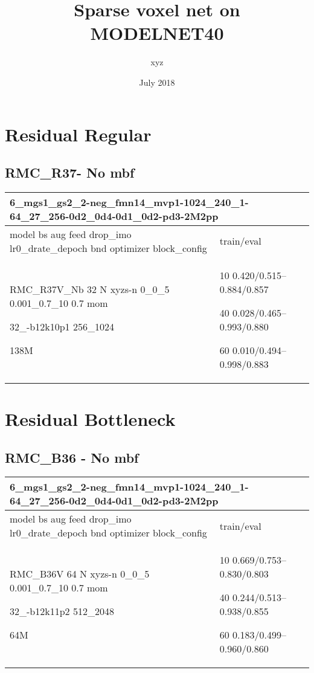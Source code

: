 \documentclass[,table,dvipsnames]{article}
\title{Sparse voxel net on MODELNET40}
\author{xyz}
\date{July 2018}
\begin{document}
\noindent
\begin{titlepage}
	\maketitle
\end{titlepage}	

\tableofcontents{}

\section{Residual Regular}
\subsection{RMC\_R37- No mbf}
\noindent\begin{tabular}{|p{10cm}|p{5cm}| }	
	\hline
	\multicolumn{2}{|p{15cm}|}{ 6\_mgs1\_gs2\_2-neg\_fmn14\_mvp1-1024\_240\_1-64\_27\_256-0d2\_0d4-0d1\_0d2-pd3-2M2pp}\\
	\hline
	model bs aug feed drop\_imo lr0\_drate\_depoch bnd optimizer block\_config & train/eval \\
	
	\rowcolor{blue!20}
	RMC\_R37V\_Nb 32 N xyzs-n 0\_0\_5 0.001\_0.7\_10 0.7 mom\par 32\_-b12k10p1 256\_1024\par 138M& 10 0.420/0.515--0.884/0.857\par 40 0.028/0.465--0.993/0.880\par 60 0.010/0.494--0.998/0.883\\
	
	\hline 
\end{tabular}

\section{Residual Bottleneck}
\subsection{RMC\_B36 - No mbf}
\noindent\begin{tabular}{|p{10cm}|p{5cm}| }	
	\hline
	\multicolumn{2}{|p{15cm}|}{ 6\_mgs1\_gs2\_2-neg\_fmn14\_mvp1-1024\_240\_1-64\_27\_256-0d2\_0d4-0d1\_0d2-pd3-2M2pp }\\
	\hline
	model bs aug feed drop\_imo lr0\_drate\_depoch bnd optimizer block\_config & train/eval \\
	
	\rowcolor{red!20}
	RMC\_B36V 64 N xyzs-n 0\_0\_5 0.001\_0.7\_10 0.7 mom\par 32\_-b12k11p2 512\_2048\par 64M&10 0.669/0.753--0.830/0.803\par40 0.244/0.513--0.938/0.855\par 60 0.183/0.499--0.960/0.860\\
	
	\hline 
\end{tabular}
\end{document}
